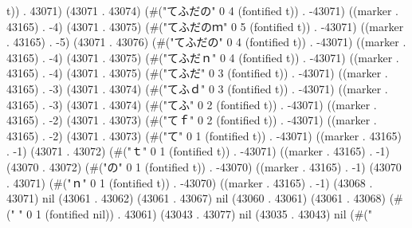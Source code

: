 t)) . 43071) (43071 . 43074) (#("てふだの" 0 4 (fontified t)) . -43071) ((marker . 43165) . -4) (43071 . 43075) (#("てふだのｍ" 0 5 (fontified t)) . -43071) ((marker . 43165) . -5) (43071 . 43076) (#("てふだの" 0 4 (fontified t)) . -43071) ((marker . 43165) . -4) (43071 . 43075) (#("てふだｎ" 0 4 (fontified t)) . -43071) ((marker . 43165) . -4) (43071 . 43075) (#("てふだ" 0 3 (fontified t)) . -43071) ((marker . 43165) . -3) (43071 . 43074) (#("てふｄ" 0 3 (fontified t)) . -43071) ((marker . 43165) . -3) (43071 . 43074) (#("てふ" 0 2 (fontified t)) . -43071) ((marker . 43165) . -2) (43071 . 43073) (#("てｆ" 0 2 (fontified t)) . -43071) ((marker . 43165) . -2) (43071 . 43073) (#("て" 0 1 (fontified t)) . -43071) ((marker . 43165) . -1) (43071 . 43072) (#("ｔ" 0 1 (fontified t)) . -43071) ((marker . 43165) . -1) (43070 . 43072) (#("の" 0 1 (fontified t)) . -43070) ((marker . 43165) . -1) (43070 . 43071) (#("ｎ" 0 1 (fontified t)) . -43070) ((marker . 43165) . -1) (43068 . 43071) nil (43061 . 43062) (43061 . 43067) nil (43060 . 43061) (43061 . 43068) (#("	" 0 1 (fontified nil)) . 43061) (43043 . 43077) nil (43035 . 43043) nil (#("
